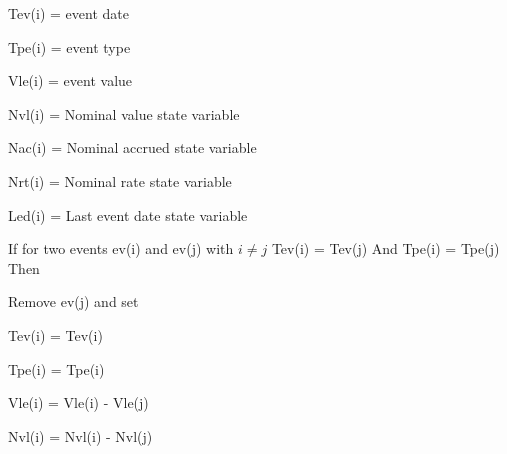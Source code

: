 \documentclass[9pt,oneside]{amsart}
\begin{document}
\begin{adjustwidth}{0.5in}{0.0in}
Tev(i) = event date

\end{adjustwidth}

\begin{adjustwidth}{0.5in}{0.0in}
Tpe(i) = event type

\end{adjustwidth}

\begin{adjustwidth}{0.5in}{0.0in}
Vle(i) = event value

\end{adjustwidth}

\begin{adjustwidth}{0.5in}{0.0in}
Nvl(i) = Nominal value state variable

\end{adjustwidth}

\begin{adjustwidth}{0.5in}{0.0in}
Nac(i) = Nominal accrued state variable

\end{adjustwidth}

\begin{adjustwidth}{0.5in}{0.0in}
Nrt(i) = Nominal rate state variable

\end{adjustwidth}

\begin{adjustwidth}{0.5in}{0.0in}
Led(i) = Last event date state variable

\end{adjustwidth}

If for two events ev(i) and ev(j) with  \( i \neq j \) Tev(i) = Tev(j) And Tpe(i) = Tpe(j) Then

\tab Remove ev(j) and set

\tab Tev(i) = Tev(i)\par

\begin{adjustwidth}{0.5in}{0.0in}
Tpe(i) = Tpe(i)\par

\end{adjustwidth}

\begin{adjustwidth}{0.5in}{0.0in}
Vle(i) = Vle(i) - Vle(j)\par

\end{adjustwidth}

\begin{adjustwidth}{0.5in}{0.0in}
Nvl(i) = Nvl(i) - Nvl(j)\par

\end{adjustwidth}
\end{document}
